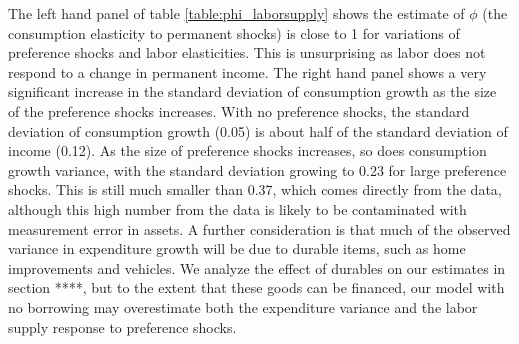 \documentclass[titlepage]{\econtex}\newcommand{\texname}{IncomeUncertainty}
\begin{document}
The left hand panel of table \ref{table:phi_laborsupply} shows the estimate of $\phi$ (the consumption elasticity to permanent shocks) is close to 1 for variations of preference shocks and labor elasticities. This is unsurprising as labor does not respond to a change in permanent income. The right hand panel shows a very significant increase in the standard deviation of consumption growth as the size of the preference shocks increases. With no preference shocks, the standard deviation of consumption growth (0.05) is about half of the standard deviation of income (0.12). As the size of preference shocks increases, so does consumption growth variance, with the standard deviation growing to 0.23 for large preference shocks. This is still much smaller than 0.37, which comes directly from the data, although this high number from the data is likely to be contaminated with measurement error in assets. A further consideration is that much of the observed variance in expenditure growth will be due to durable items, such as home improvements and vehicles. We analyze the effect of durables on our estimates in section ****, but to the extent that these goods can be financed, our model with no borrowing may overestimate both the expenditure variance and the labor supply response to preference shocks.
\end{document}
